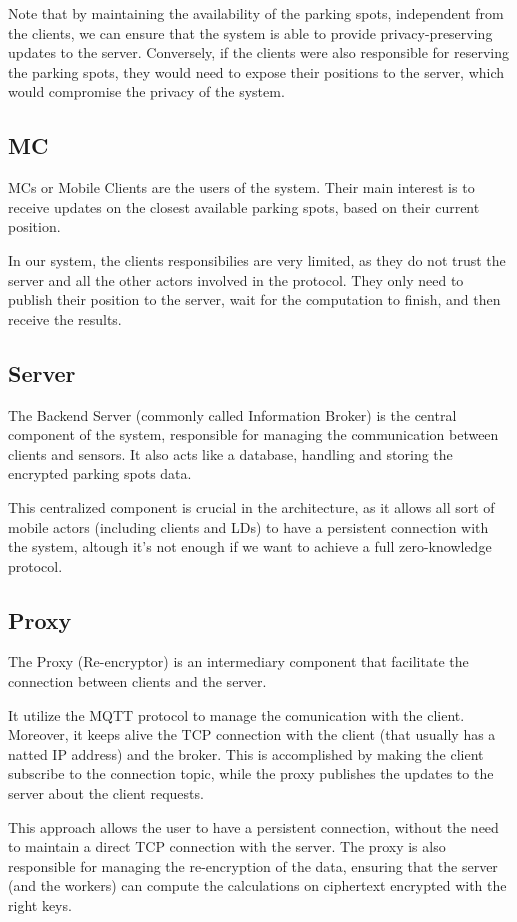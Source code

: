 \documentclass[12pt,a4paper,twoside]{book}
\begin{document}
Note that by maintaining the availability of the parking spots, independent from the clients, we can ensure that the system is able to provide privacy-preserving updates to the server. Conversely, if the clients were also responsible for reserving the parking spots, they would need to expose their positions to the server, which would compromise the privacy of the system.

\subsection{MC}
MCs or Mobile Clients are the users of the system. Their main interest is to receive updates on the closest available parking spots, based on their current position. 

In our system, the clients responsibilies are very limited, as they do not trust the server and all the other actors involved in the protocol. They only need to publish their position to the server, wait for the computation to finish, and then receive the results.

\subsection{Server}
The Backend Server (commonly called Information Broker) is the central component of the system, responsible for managing the communication between clients and sensors. It also acts like a database, handling and storing the encrypted parking spots data.

This centralized component is crucial in the architecture, as it allows all sort of mobile actors (including clients and LDs) to have a persistent connection with the system, altough it's not enough if we want to achieve a full zero-knowledge protocol.

\subsection{Proxy}
The Proxy (Re-encryptor) is an intermediary component that facilitate the connection between clients and the server.

It utilize the MQTT protocol to manage the comunication with the client. Moreover, it keeps alive the TCP connection with the client (that usually has a natted IP address) and the broker.
This is accomplished by making the client subscribe to the connection topic, while the proxy publishes the updates to the server about the client requests.

This approach allows the user to have a persistent connection, without the need to maintain a direct TCP connection with the server. The proxy is also responsible for managing the re-encryption of the data, ensuring that the server (and the workers) can compute the calculations on ciphertext encrypted with the right keys.
\end{document}

